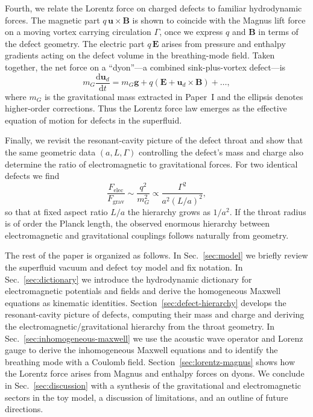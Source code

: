 \documentclass[11pt]{article}
\newcommand{\dd}{\mathrm{d}}
\begin{document}
Fourth, we relate the Lorentz force on charged defects to familiar hydrodynamic forces.  The magnetic part $q\,\mathbf{u}\times\mathbf{B}$ is shown to coincide with the Magnus lift force on a moving vortex carrying circulation $\Gamma$, once we express $q$ and $\mathbf{B}$ in terms of the defect geometry.  The electric part $q\,\mathbf{E}$ arises from pressure and enthalpy gradients acting on the defect volume in the breathing-mode field.  Taken together, the net force on a ``dyon''---a combined sink-plus-vortex defect---is
\begin{equation}
m_G \frac{\dd \mathbf{u}_d}{\dd t}
= m_G \mathbf{g} + q\left(\mathbf{E} + \mathbf{u}_d \times \mathbf{B}\right) + \dots,
\end{equation}
where $m_G$ is the gravitational mass extracted in Paper~I and the ellipsis denotes higher-order corrections.  Thus the Lorentz force law emerges as the effective equation of motion for defects in the superfluid.

Finally, we revisit the resonant-cavity picture of the defect throat and show that the same geometric data $(a,L,\Gamma)$ controlling the defect's mass and charge also determine the ratio of electromagnetic to gravitational forces.  For two identical defects we find
\begin{equation}
\frac{F_{\mathrm{elec}}}{F_{\mathrm{grav}}}
\sim \frac{q^2}{m_G^2} \propto \frac{\Gamma^2}{a^2 (L/a)^2},
\end{equation}
so that at fixed aspect ratio $L/a$ the hierarchy grows as $1/a^2$.  If the throat radius is of order the Planck length, the observed enormous hierarchy between electromagnetic and gravitational couplings follows naturally from geometry.

The rest of the paper is organized as follows.  In Sec.~\ref{sec:model} we briefly review the superfluid vacuum and defect toy model and fix notation.  In Sec.~\ref{sec:dictionary} we introduce the hydrodynamic dictionary for electromagnetic potentials and fields and derive the homogeneous Maxwell equations as kinematic identities.  Section~\ref{sec:defect-hierarchy} develops the resonant-cavity picture of defects, computing their mass and charge and deriving the electromagnetic/gravitational hierarchy from the throat geometry.  In Sec.~\ref{sec:inhomogeneous-maxwell} we use the acoustic wave operator and Lorenz gauge to derive the inhomogeneous Maxwell equations and to identify the breathing mode with a Coulomb field.  Section~\ref{sec:lorentz-magnus} shows how the Lorentz force arises from Magnus and enthalpy forces on dyons.  We conclude in Sec.~\ref{sec:discussion} with a synthesis of the gravitational and electromagnetic sectors in the toy model, a discussion of limitations, and an outline of future directions.
\end{document}
